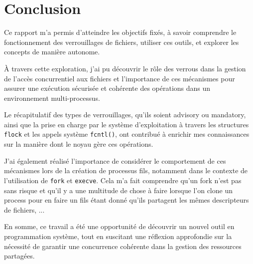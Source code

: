 \newpage
\section{Conclusion}
Ce rapport m'a permis d'atteindre les objectifs fixés, à savoir comprendre le fonctionnement des verrouillages de fichiers, utiliser ces outils, et explorer les concepts de manière autonome.

À travers cette exploration, j'ai pu découvrir le rôle des verrous dans la gestion de l'accès concurrentiel aux fichiers et l'importance de ces mécanismes pour assurer une exécution sécurisée et cohérente des opérations dans un environnement multi-processus.

Le récapitulatif des types de verrouillages, qu'ils soient advisory ou mandatory, ainsi que la prise en charge par le système d'exploitation à travers les structures \texttt{flock} et les appels système \texttt{fcntl()}, ont contribué à enrichir mes connaissances sur la manière dont le noyau gère ces opérations.

J'ai également réalisé l'importance de considérer le comportement de ces mécanismes lors de la création de processus fils, notamment dans le contexte de l'utilisation de \texttt{fork} et \texttt{execve}. Cela m'a fait comprendre qu'un fork n'est pas sans risque et qu'il y a une multitude de chose à faire lorsque l'on clone un process pour en faire un fils étant donné qu'ils partagent les mêmes descripteurs de fichiers, ...

En somme, ce travail a été une opportunité de découvrir un nouvel outil en programmation système, tout en suscitant une réflexion approfondie sur la nécessité de garantir une concurrence cohérente dans la gestion des ressources partagées.
